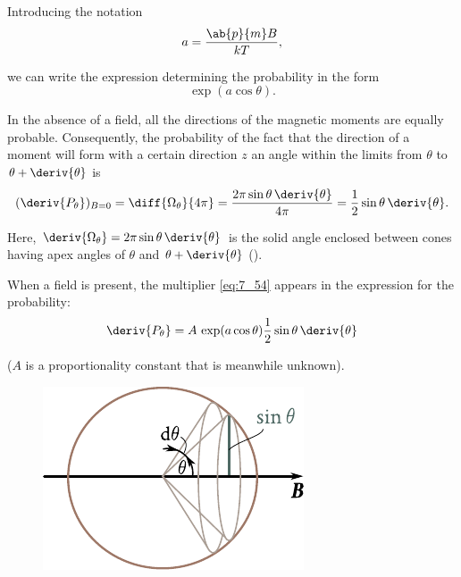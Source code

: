 \noindent
Introducing the notation
\begin{equation}\label{eq:7_53}
    a = \frac{\ab{p}{m} B}{kT},
\end{equation}

\noindent
we can write the expression determining the probability in the form
\begin{equation}\label{eq:7_54}
    \exp(a\cos\theta).
\end{equation}

In the absence of a field, all the directions of the magnetic moments are equally probable.
Consequently, the probability of the fact that the direction of a moment will form with a certain direction $z$ an angle within the limits from $\theta$ to $\theta + \deriv{\theta}$ is
\begin{equation}\label{eq:7_55}
    (\deriv{P_{\theta}})_{B=0} = \diff{\Omega_{\theta}}{4\pi} = \frac{2\pi\sin\theta\, \deriv{\theta}}{4\pi} = \frac{1}{2}\sin\theta\, \deriv{\theta}.
\end{equation}

\noindent
Here, $\deriv{\Omega_{\theta}}=2\pi\sin\theta\, \deriv{\theta}$ is the solid angle enclosed between cones having apex angles of $\theta$ and $\theta+\deriv{\theta}$ ().

When a field is present, the multiplier \eqref{eq:7_54} appears in the expression for the
probability:
\begin{equation}\label{eq:7_56}
    \deriv{P_{\theta}} = A\, \exp(a\cos\theta) \frac{1}{2}\sin\theta\, \deriv{\theta}
\end{equation}

\noindent
($A$ is a proportionality constant that is meanwhile unknown).

\begin{figure}[!htb]
	\begin{center}
		\includegraphics[scale=1]{figures/ch_07/fig_7_16.pdf}
		\caption[]{}
		\label{fig:7_16}
	\end{center}
	\vspace{-0.8cm}
\end{figure}

